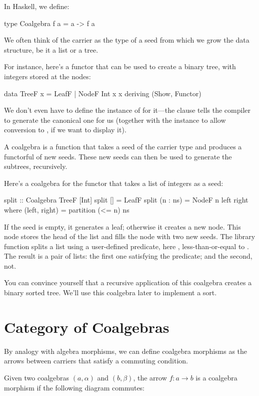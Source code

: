 \documentclass[DaoFP]{subfiles}
\begin{document}
In Haskell, we define:
\begin{haskell}
 type Coalgebra f a = a -> f a
\end{haskell}
We often think of the carrier as the type of a seed from which we grow the data structure, be it a list or a tree. 

For instance, here's a functor that can be used to create a binary tree, with integers stored at the nodes:
\begin{haskell}
data TreeF x = LeafF | NodeF Int x x
  deriving (Show, Functor)
\end{haskell}
We don't even have to define the instance of  for it---the  clause tells the compiler to generate the canonical one for us (together with the  instance to allow conversion to , if we want to display it).

A coalgebra is a function that takes a seed of the carrier type and produces a functorful of new seeds. These new seeds can then be used to generate the subtrees, recursively. 

Here's a coalgebra for the functor  that takes a list of integers as a seed:
\begin{haskell}
split :: Coalgebra TreeF [Int]
split [] = LeafF
split (n : ns) = NodeF n left right
  where
    (left, right) = partition (<= n) ns
\end{haskell}
If the seed is empty, it generates a leaf; otherwise it creates a new node. This node stores the head of the list and fills the node with two new seeds. The library function  splits a list using a user-defined predicate, here , less-than-or-equal to . The result is a pair of lists: the first one satisfying the predicate; and the second, not. 

You can convince yourself that a recursive application of this coalgebra creates a binary sorted tree. We'll use this coalgebra later to implement a sort.

\section{Category of Coalgebras}

By analogy with algebra morphisms, we can define coalgebra morphisms as the arrows between carriers that satisfy a commuting condition. 

Given two coalgebras $(a, \alpha)$ and $(b, \beta)$, the arrow $f \colon a \to b$ is a coalgebra morphism if the following diagram commutes:
\end{document}
